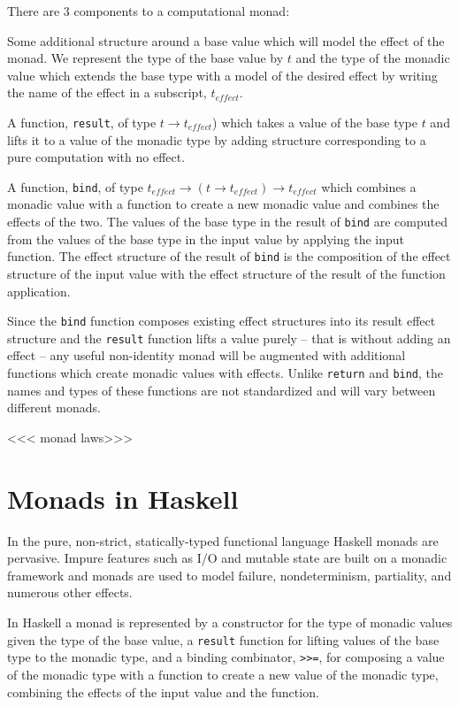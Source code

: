\documentclass[preprint,natbib,10pt]{sigplanconf}
\begin{document}
There are 3 components to a computational monad:

Some additional structure around a base value which will model the
effect of the monad.  We represent the type of the base value by
$t$ and the type of the monadic value which extends the base type
with a model of the desired effect by writing the name of the effect
in a subscript, $t_{effect}$.

A function, {\tt result}, of type $t \rightarrow t_{effect}$) which
takes a value of the base type $t$ and lifts it to a value of the
monadic type by adding structure corresponding to a pure computation
with no effect.

A function, {\tt bind}, of type $t_{effect} \rightarrow (t \rightarrow
t_{effect}) \rightarrow t_{effect}$ which combines a monadic value
with a function to create a new monadic value and combines the effects
of the two.  The values of the base type in the result of {\tt bind}
are computed from the values of the base type in the input value by
applying the input function.  The effect structure of the result of
{\tt bind} is the composition of the effect structure of the input
value with the effect structure of the result of the function
application.

Since the {\tt bind} function composes existing effect structures into
its result effect structure and the {\tt result} function lifts a
value purely -- that is without adding an effect -- any useful
non-identity monad will be augmented with additional functions which
create monadic values with effects.  Unlike {\tt return} and
{\tt bind}, the names and types of these functions are not standardized
and will vary between different monads.

<<< monad laws>>>

\section{Monads in Haskell}

In the pure, non-strict, statically-typed functional language Haskell
monads are pervasive.  Impure features such as I/O and mutable state
are built on a monadic framework and monads are used to model failure,
nondeterminism, partiality, and numerous other effects.

In Haskell a monad is represented by a constructor for the type of
monadic values given the type of the base value, a {\tt result}
function for lifting values of the base type to the monadic type, and
a binding combinator, {\tt >>=}, for composing a value of the monadic
type with a function to create a new value of the monadic type,
combining the effects of the input value and the function.
\end{document}
